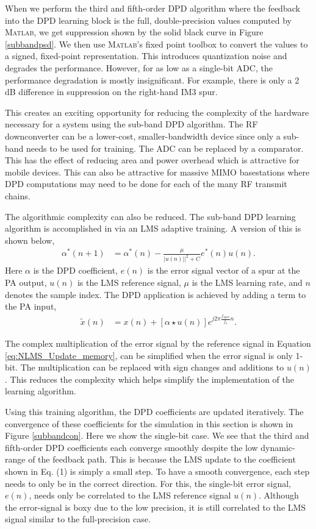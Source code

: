 \documentclass[conference]{IEEEtran}
\begin{document}
 When we perform the third and fifth-order DPD algorithm where the feedback into the DPD learning block is the full, double-precision values computed by \textsc{Matlab}, we get suppression shown by the solid black curve in Figure \ref{subbandpsd}. We then use \textsc{Matlab}'s fixed point toolbox to convert the values to a signed, fixed-point representation. This introduces quantization noise and degrades the performance. 
 However, for as low as a single-bit ADC, the performance degradation is mostly insignificant. For example, there is only a 2 dB difference in suppression on the right-hand IM3 spur. 
 
 This creates an exciting opportunity for reducing the complexity of the hardware necessary for a system using the sub-band DPD algorithm. 
 The RF downconverter can be a lower-cost, smaller-bandwidth device since only a sub-band needs to be used for training.
 The ADC can be replaced by a comparator.
 This has the effect of reducing area and power overhead which is attractive for mobile devices. This can also be attractive for massive MIMO basestations where DPD computations may need to be done for each of the many RF transmit chains. 
 
 The algorithmic complexity can also be reduced. The sub-band DPD learning algorithm is accomplished in \cite{TMTT_SubbandDPD} via an LMS adaptive training. A version of this is shown below,
 \begin{align}
 \alpha^*(n+1) &= \alpha^*(n) - \frac{\mu}{|u(n)||^2 + C} e^*(n) u(n).
 \label{eq:NLMS_Update_memory}
 \end{align}
Here $\alpha$ is the DPD coefficient,
$e(n)$ is the error signal vector of a spur at the PA output, $u(n)$ is the LMS reference signal, $\mu$ is the LMS learning rate, and $n$ denotes the sample index. 
The DPD application is achieved by adding a term to the PA input,
\begin{align}
\tilde{x}(n) &=  x(n) + \left[\alpha \star u(n) \right] e^{j 2\pi \frac{f_{spur}}{f_s} n}.
\end{align}

The complex multiplication of the error signal by the reference signal in Equation \ref{eq:NLMS_Update_memory}, can be simplified when the error signal is only 1-bit. The multiplication can be replaced with sign changes and additions to $u(n)$. This reduces the complexity which helps simplify the implementation of the learning algorithm. 

Using this training algorithm, the DPD coefficients are updated iteratively. The convergence of these coefficients for the simulation in this section is shown in Figure \ref{subbandcon}. Here we show the single-bit case. We see that the third and fifth-order DPD coefficients each converge smoothly despite the low dynamic-range of the feedback path. This is because the LMS update to the coefficient shown in Eq. (1) is simply a small step. To have a smooth convergence, each step needs to only be in the correct direction. For this, the single-bit error signal, $e(n)$, needs only be correlated to the LMS reference signal $u(n).$ Although the error-signal is boxy due to the low precision, it is still correlated to the LMS signal similar to the full-precision case. 
\end{document}
